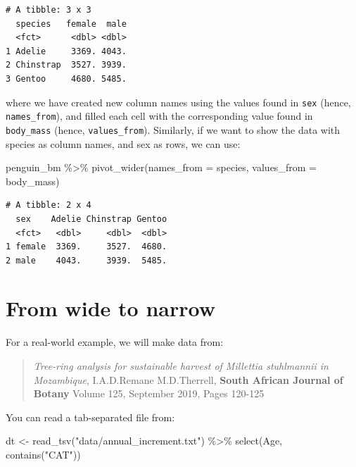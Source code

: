 \documentclass[
  letterpaper,
  DIV=11,
  numbers=noendperiod]{scrreprt}
\newenvironment{Shaded}{\begin{snugshade}}{\end{snugshade}}
\newcommand{\AttributeTok}[1]{\textcolor[rgb]{0.40,0.45,0.13}{#1}}
\newcommand{\FunctionTok}[1]{\textcolor[rgb]{0.28,0.35,0.67}{#1}}
\newcommand{\NormalTok}[1]{\textcolor[rgb]{0.00,0.23,0.31}{#1}}
\newcommand{\OtherTok}[1]{\textcolor[rgb]{0.00,0.23,0.31}{#1}}
\newcommand{\SpecialCharTok}[1]{\textcolor[rgb]{0.37,0.37,0.37}{#1}}
\newcommand{\StringTok}[1]{\textcolor[rgb]{0.13,0.47,0.30}{#1}}
\begin{document}
\begin{verbatim}
# A tibble: 3 x 3
  species   female  male
  <fct>      <dbl> <dbl>
1 Adelie     3369. 4043.
2 Chinstrap  3527. 3939.
3 Gentoo     4680. 5485.
\end{verbatim}

where we have created new column names using the values found in
\texttt{sex} (hence, \texttt{names\_from}), and filled each cell with
the corresponding value found in \texttt{body\_mass} (hence,
\texttt{values\_from}). Similarly, if we want to show the data with
species as column names, and sex as rows, we can use:

\begin{Shaded}
\begin{Highlighting}[]
\NormalTok{penguin\_bm }\SpecialCharTok{\%\textgreater{}\%} 
  \FunctionTok{pivot\_wider}\NormalTok{(}\AttributeTok{names\_from =}\NormalTok{ species, }\AttributeTok{values\_from =}\NormalTok{ body\_mass)}
\end{Highlighting}
\end{Shaded}

\begin{verbatim}
# A tibble: 2 x 4
  sex    Adelie Chinstrap Gentoo
  <fct>   <dbl>     <dbl>  <dbl>
1 female  3369.     3527.  4680.
2 male    4043.     3939.  5485.
\end{verbatim}

\hypertarget{from-wide-to-narrow}{%
\section{From wide to narrow}\label{from-wide-to-narrow}}

For a real-world example, we will make data from:

\begin{quote}
\emph{Tree-ring analysis for sustainable harvest of Millettia
stuhlmannii in Mozambique}, I.A.D.Remane M.D.Therrell, \textbf{South
African Journal of Botany} Volume 125, September 2019, Pages 120-125
\end{quote}

You can read a tab-separated file from:

\begin{Shaded}
\begin{Highlighting}[]
\NormalTok{dt }\OtherTok{\textless{}{-}} \FunctionTok{read\_tsv}\NormalTok{(}\StringTok{"data/annual\_increment.txt"}\NormalTok{) }\SpecialCharTok{\%\textgreater{}\%} 
  \FunctionTok{select}\NormalTok{(Age, }\FunctionTok{contains}\NormalTok{(}\StringTok{"CAT"}\NormalTok{))}
\end{Highlighting}
\end{Shaded}
\end{document}
